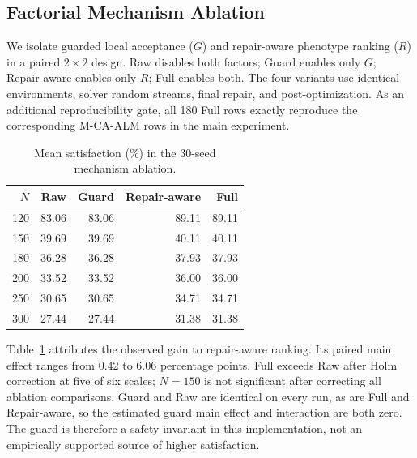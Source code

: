 \documentclass[pdflatex,sn-mathphys-num]{sn-jnl}
\begin{document}
\subsection{Factorial Mechanism Ablation}
We isolate guarded local acceptance ($G$) and repair-aware phenotype ranking ($R$) in a paired $2\times2$ design. Raw disables both factors; Guard enables only $G$; Repair-aware enables only $R$; Full enables both. The four variants use identical environments, solver random streams, final repair, and post-optimization. As an additional reproducibility gate, all 180 Full rows exactly reproduce the corresponding M-CA-ALM rows in the main experiment.

\begin{table}[t]
\centering
\caption{Mean satisfaction (\%) in the 30-seed mechanism ablation.}
\label{tab:official_ablation}
\small
\begin{tabular}{rrrrr}
\toprule
$N$ & Raw & Guard & Repair-aware & Full \\
\midrule
120 & 83.06 & 83.06 & 89.11 & 89.11 \\
150 & 39.69 & 39.69 & 40.11 & 40.11 \\
180 & 36.28 & 36.28 & 37.93 & 37.93 \\
200 & 33.52 & 33.52 & 36.00 & 36.00 \\
250 & 30.65 & 30.65 & 34.71 & 34.71 \\
300 & 27.44 & 27.44 & 31.38 & 31.38 \\
\bottomrule
\end{tabular}
\end{table}

Table~\ref{tab:official_ablation} attributes the observed gain to repair-aware ranking. Its paired main effect ranges from 0.42 to 6.06 percentage points. Full exceeds Raw after Holm correction at five of six scales; $N=150$ is not significant after correcting all ablation comparisons. Guard and Raw are identical on every run, as are Full and Repair-aware, so the estimated guard main effect and interaction are both zero. The guard is therefore a safety invariant in this implementation, not an empirically supported source of higher satisfaction.
\end{document}
